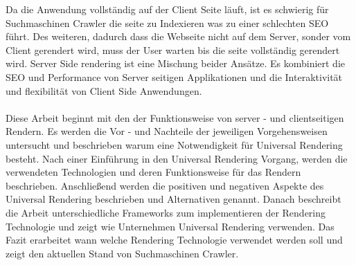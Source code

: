 \documentclass[runningheads]{llncs}
\begin{document}
Da die Anwendung vollständig auf der Client Seite läuft, ist es schwierig für Suchmaschinen Crawler die seite zu Indexieren was zu einer schlechten SEO führt.
Des weiteren, dadurch dass die Webseite nicht auf dem Server, sonder vom Client gerendert wird, muss der User warten bis die seite vollständig gerendert wird.
Server Side rendering ist eine Mischung beider Ansätze. Es kombiniert die SEO und Performance von Server seitigen Applikationen und die Interaktivität und flexibilität von Client Side Anwendungen.
\\
\\
Diese Arbeit beginnt mit den der Funktionsweise von server - und clientseitigen Rendern. 
Es werden die Vor - und Nachteile der jeweiligen Vorgehensweisen untersucht 
und beschrieben warum eine Notwendigkeit für Universal Rendering besteht. Nach einer Einführung in den Universal Rendering Vorgang, werden die verwendeten Technologien und deren Funktionsweise für das Rendern beschrieben. Anschließend werden die positiven und negativen Aspekte des Universal Rendering beschrieben und Alternativen genannt. Danach beschreibt die Arbeit unterschiedliche Frameworks zum implementieren der Rendering Technologie und zeigt wie Unternehmen Universal Rendering verwenden. Das Fazit erarbeitet wann welche Rendering Technologie verwendet werden soll und zeigt den aktuellen Stand von Suchmaschinen Crawler.
\newpage
\end{document}
